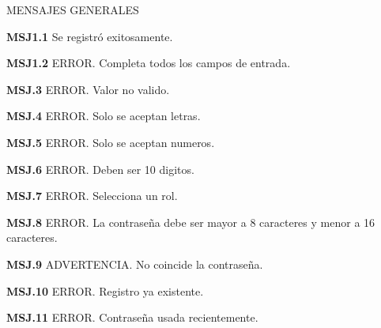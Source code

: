 MENSAJES GENERALES
	\begin{Citemize}
	\item {\bf MSJ1.1} Se registró exitosamente.
	\end{Citemize}
	
	\begin{Citemize}
	\item {\bf MSJ1.2} ERROR. Completa todos los campos de entrada.
	\end{Citemize}
	
	\begin{Citemize}
	\item {\bf MSJ.3} ERROR. Valor no valido.
	\end{Citemize}
	
	\begin{Citemize}
	\item {\bf MSJ.4} ERROR. Solo se aceptan letras.
	\end{Citemize}
	
	\begin{Citemize}
	\item {\bf MSJ.5} ERROR. Solo se aceptan numeros.
	\end{Citemize}
	
	\begin{Citemize}
	\item {\bf MSJ.6} ERROR. Deben ser 10 digitos.
	\end{Citemize}
	
	\begin{Citemize}
	\item {\bf MSJ.7} ERROR. Selecciona un rol.
	\end{Citemize}
	
	\begin{Citemize}
	\item {\bf MSJ.8} ERROR. La contraseña debe ser mayor a 8 caracteres y menor a 16 caracteres.
	\end{Citemize}
	
	\begin{Citemize}
	\item {\bf MSJ.9} ADVERTENCIA. No coincide la contraseña.
	\end{Citemize}
	
	\begin{Citemize}
	\item {\bf MSJ.10} ERROR. Registro ya existente.
	\end{Citemize}
	
	\begin{Citemize}
	\item {\bf MSJ.11} ERROR. Contraseña usada recientemente.
	\end{Citemize}
	
